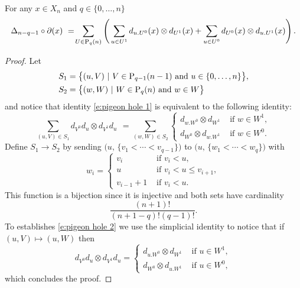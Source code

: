 
\begin{lemma} \label{l:pigeon hole}
	For any $x \in X_n$ and $q \in \{0, \dots, n\}$
	\begin{equation} \label{e:pigeon hole 1}
	\Delta_{n-q-1} \circ \partial (x)\ =\! 
	\sum_{U \in \P_q(n)} \left( \,
	\sum_{u \in U^1} d_{u.U^0}(x) \otimes d_{U^1}(x) + 
	\sum_{u \in U^0} d_{U^0}(x) \otimes d_{u.U^1}(x) \right).
	\end{equation}
\end{lemma}

\begin{proof}
	Let
	\begin{align*}
	& S_1 = \big\{ (u, V)\ |\ V \in \P_{q-1}(n-1) \text{ and } u \in \{0,\dots,n\} \big\}, \\
	& S_2 = \big\{ (w, W)\ |\ W \in \P_{q}(n) \text{ and } w \in W \big\}
	\end{align*}
	and notice that identity \eqref{e:pigeon hole 1} is equivalent to the following identity:
	\begin{equation} \label{e:pigeon hole 2}
	\sum_{(u, V) \in S_1} d_{V^0}d_u \otimes d_{V^1}d_u \ \, = \!
	\sum_{(w, W) \in S_2} 
	\begin{cases}
	d_{w.W^0} \otimes d_{W^1} & \text{ if } w \in W^1, \\
	d_{W^0} \otimes d_{w.W^1} & \text{ if } w \in W^0.
	\end{cases}
	\end{equation}	
	Define $S_1 \to S_2$ by sending $\big(u,\, \{v_1 < \cdots < v_{q-1}\} \big)$ to $\big(u,\, \{w_1 < \cdots < w_{q}\} \big)$ with
	\begin{equation*}
	w_i = 
	\begin{cases}
	v_i & \text{ if } v_i < u, \\
	u & \text{ if } v_i < u \leq v_{i+1}, \\
	v_{i-1}+1 & \text{ if } v_i < u.
	\end{cases}
	\end{equation*} 
	This function is a bijection since it is injective and both sets have cardinality 
	\begin{equation*}
	\frac{(n+1)!}{(n+1-q)!(q-1)!}.
	\end{equation*}
	To establishes \eqref{e:pigeon hole 2} we use the simplicial identity to notice that if $(u, V) \mapsto (u, W)$ then
	\begin{equation*}
	d_{V^0}d_u \otimes d_{V^1}d_u =
	\begin{cases}
	d_{u.W^0} \otimes d_{W^1} & \text{ if } u \in W^1, \\
	d_{W^0} \otimes d_{u.W^1} & \text{ if } u \in W^0,
	\end{cases}
	\end{equation*}
	which concludes the proof.
\end{proof}


